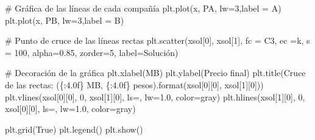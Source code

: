 \documentclass[
  letterpaper,
  DIV=11,
  numbers=noendperiod]{scrreprt}
\newenvironment{Shaded}{\begin{snugshade}}{\end{snugshade}}
\newcommand{\BuiltInTok}[1]{\textcolor[rgb]{0.00,0.23,0.31}{#1}}
\newcommand{\CommentTok}[1]{\textcolor[rgb]{0.37,0.37,0.37}{#1}}
\newcommand{\DecValTok}[1]{\textcolor[rgb]{0.68,0.00,0.00}{#1}}
\newcommand{\FloatTok}[1]{\textcolor[rgb]{0.68,0.00,0.00}{#1}}
\newcommand{\NormalTok}[1]{\textcolor[rgb]{0.00,0.23,0.31}{#1}}
\newcommand{\OperatorTok}[1]{\textcolor[rgb]{0.37,0.37,0.37}{#1}}
\newcommand{\SpecialCharTok}[1]{\textcolor[rgb]{0.37,0.37,0.37}{#1}}
\newcommand{\StringTok}[1]{\textcolor[rgb]{0.13,0.47,0.30}{#1}}
\newcommand{\VariableTok}[1]{\textcolor[rgb]{0.07,0.07,0.07}{#1}}
\begin{document}
\begin{Shaded}
\begin{Highlighting}[]
\CommentTok{\# Gráfica de las líneas de cada compañía}
\NormalTok{plt.plot(x, PA, lw}\OperatorTok{=}\DecValTok{3}\NormalTok{,label }\OperatorTok{=} \StringTok{\textquotesingle{}A\textquotesingle{}}\NormalTok{)}
\NormalTok{plt.plot(x, PB, lw}\OperatorTok{=}\DecValTok{3}\NormalTok{,label }\OperatorTok{=} \StringTok{\textquotesingle{}B\textquotesingle{}}\NormalTok{)}

\CommentTok{\# Punto de cruce de las líneas rectas}
\NormalTok{plt.scatter(xsol[}\DecValTok{0}\NormalTok{], xsol[}\DecValTok{1}\NormalTok{], fc }\OperatorTok{=} \StringTok{\textquotesingle{}C3\textquotesingle{}}\NormalTok{, ec }\OperatorTok{=}\StringTok{\textquotesingle{}k\textquotesingle{}}\NormalTok{, s }\OperatorTok{=} \DecValTok{100}\NormalTok{, alpha}\OperatorTok{=}\FloatTok{0.85}\NormalTok{, zorder}\OperatorTok{=}\DecValTok{5}\NormalTok{, label}\OperatorTok{=}\StringTok{\textquotesingle{}Solución\textquotesingle{}}\NormalTok{)}

\CommentTok{\# Decoración de la gráfica}
\NormalTok{plt.xlabel(}\StringTok{\textquotesingle{}MB\textquotesingle{}}\NormalTok{)}
\NormalTok{plt.ylabel(}\StringTok{\textquotesingle{}Precio final\textquotesingle{}}\NormalTok{)}
\NormalTok{plt.title(}\StringTok{\textquotesingle{}Cruce de las rectas: (}\SpecialCharTok{\{:4.0f\}}\StringTok{ MB, }\SpecialCharTok{\{:4.0f\}}\StringTok{ pesos)\textquotesingle{}}\NormalTok{.}\BuiltInTok{format}\NormalTok{(xsol[}\DecValTok{0}\NormalTok{][}\DecValTok{0}\NormalTok{], xsol[}\DecValTok{1}\NormalTok{][}\DecValTok{0}\NormalTok{]))}
\NormalTok{plt.vlines(xsol[}\DecValTok{0}\NormalTok{][}\DecValTok{0}\NormalTok{], }\DecValTok{0}\NormalTok{, xsol[}\DecValTok{1}\NormalTok{][}\DecValTok{0}\NormalTok{], ls}\OperatorTok{=}\StringTok{\textquotesingle{}{-}{-}\textquotesingle{}}\NormalTok{, lw}\OperatorTok{=}\FloatTok{1.0}\NormalTok{, color}\OperatorTok{=}\StringTok{\textquotesingle{}gray\textquotesingle{}}\NormalTok{)}
\NormalTok{plt.hlines(xsol[}\DecValTok{1}\NormalTok{][}\DecValTok{0}\NormalTok{], }\DecValTok{0}\NormalTok{, xsol[}\DecValTok{0}\NormalTok{][}\DecValTok{0}\NormalTok{], ls}\OperatorTok{=}\StringTok{\textquotesingle{}{-}{-}\textquotesingle{}}\NormalTok{, lw}\OperatorTok{=}\FloatTok{1.0}\NormalTok{, color}\OperatorTok{=}\StringTok{\textquotesingle{}gray\textquotesingle{}}\NormalTok{)}

\NormalTok{plt.grid(}\VariableTok{True}\NormalTok{)}
\NormalTok{plt.legend()}
\NormalTok{plt.show()}
\end{Highlighting}
\end{Shaded}
\end{document}
